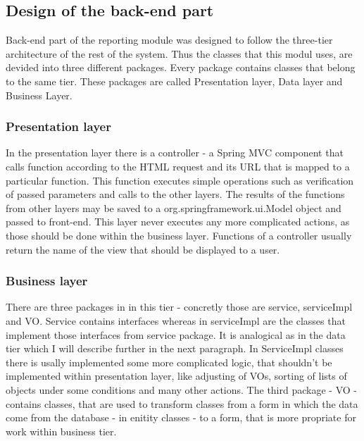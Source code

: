 \documentclass[thesis=B,english]{FITthesis}[2012/10/20]
\begin{document}


\subsection{Design of the back-end part}
Back-end part of the reporting module was designed to follow the three-tier architecture of the rest of the system. Thus the classes that this modul uses, are devided into three different packages. Every package contains classes that belong to the same tier. These packages are called Presentation layer, Data layer and Business Layer.

\subsubsection{Presentation layer}
In the presentation layer there is a controller - a Spring MVC component that calls function according to the  HTML request and its URL that is mapped to a particular function. This function executes simple operations such as verification of passed parameters and calls to the other layers. The results of the functions from other layers may be saved to a org.springframework.ui.Model object and passed to front-end. This layer never executes any more complicated actions, as those should be done within the business layer. Functions of a controller usually return the name of the view that should be displayed to a user.
\subsubsection{Business layer}
There are three packages in in this tier - concretly those are service, serviceImpl and VO. Service contains interfaces whereas in serviceImpl are the classes that implement those interfaces from service package. It is analogical as in the data tier which I will describe further in the next paragraph.
In ServiceImpl classes there is usally implemented some more complicated logic, that shouldn't be implemented within presentation layer, like adjusting of VOs, sorting of lists of objects under some conditions and many other actions.
The third package - VO - contains classes, that are used to transform classes from a form in which the data come from the database - in enitity classes - to a form, that is more propriate for work within business tier.
\end{document}
